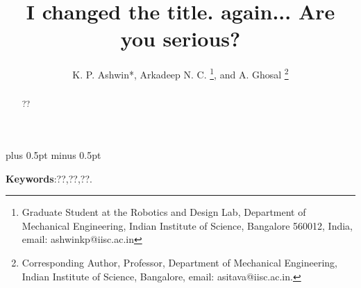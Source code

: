 \documentclass[12pt,a4]{article}
\begin{document}
%
\title{I changed the title. again... Are you serious?}
%
%
\author{K. P. Ashwin*, Arkadeep N. C.
\thanks{Graduate Student at the Robotics and Design Lab, Department
of Mechanical Engineering, Indian Institute of Science, Bangalore 560012, India, email: ashwinkp@iisc.ac.in}, 
 and A. Ghosal
\thanks{Corresponding Author, Professor, Department of Mechanical Engineering, Indian Institute of Science, Bangalore, email: asitava@iisc.ac.in.}}
%
\baselineskip 18pt plus 0.5pt minus 0.5pt
%
\date{}
\maketitle
\begin{abstract}
\label{sec:abstract}
??
\end{abstract}

\textbf{Keywords}:??,??,??.
\end{document}
